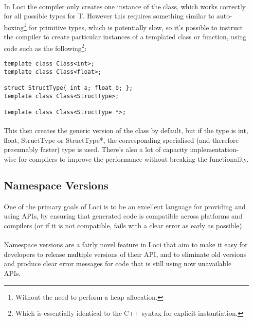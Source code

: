 \documentclass[12pt,twoside,notitlepage]{report}
\begin{document}
\paragraph{}
In Loci the compiler only creates one instance of the class, which works correctly for all possible types for T. However this requires something similar to auto-boxing\footnote{Without the need to perform a heap allocation.} for primitive types, which is potentially slow, so it's possible to instruct the compiler to create particular instances of a templated class or function, using code such as the following\footnote{Which is essentially identical to the C++ syntax for explicit instantiation.}:


\begin{lstlisting}
template class Class<int>;
template class Class<float>;

struct StructType{ int a; float b; };
template class Class<StructType>;

template class Class<StructType *>;
\end{lstlisting}


\paragraph{}
This then creates the generic version of the class by default, but if the type is int, float, StructType or StructType*, the corresponding specialised (and therefore presumably faster) type is used. There's also a lot of capacity implementation-wise for compilers to improve the performance without breaking the functionality.

\clearpage

\subsection{Namespace Versions}

\paragraph{}
One of the primary goals of Loci is to be an excellent language for providing and using APIs, by ensuring that generated code is compatible across platforms and compilers (or if it is not compatible, fails with a clear error as early as possible).

\paragraph{}
Namespace versions are a fairly novel feature in Loci that aim to make it easy for developers to release multiple versions of their API, and to eliminate old versions and produce clear error messages for code that is still using now unavailable APIs.
\end{document}
